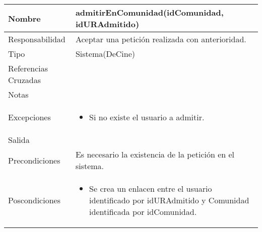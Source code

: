 \documentclass{article}
\begin{document}
\begin{table}[h]
\begin{tabular}{|l|l|l|l|l|l|}
\hline
\multicolumn{2}{|p{3cm}|}{Nombre} & \multicolumn{4}{p{10cm}|}{\textbf{admitirEnComunidad(idComunidad, idURAdmitido)}}\\
\hline
\multicolumn{2}{|p{3cm}|}{Responsabilidad} & \multicolumn{4}{p{10cm}|}{Aceptar una petición realizada con anterioridad.} \\
\hline
\multicolumn{2}{|p{3cm}|}{Tipo} & \multicolumn{4}{p{10cm}|}{Sistema(DeCine)} \\
\hline
\multicolumn{2}{|p{3cm}|}{Referencias Cruzadas} & \multicolumn{4}{p{10cm}|}{} \\
\hline
\multicolumn{2}{|p{3cm}|}{Notas} & \multicolumn{4}{p{10cm}|}{} \\
\hline
\multicolumn{2}{|p{3cm}|}{Excepciones} & \multicolumn{4}{p{10cm}|}{\begin{itemize}
\item Si no existe el usuario a admitir.
\end{itemize}} \\
\hline
\multicolumn{2}{|p{3cm}|}{Salida} & \multicolumn{4}{p{10cm}|}{} \\
\hline
\multicolumn{2}{|p{3cm}|}{Precondiciones} & \multicolumn{4}{p{10cm}|}{Es necesario la existencia de la petición en el sistema.} \\
\hline
\multicolumn{2}{|p{3cm}|}{Poscondiciones} & \multicolumn{4}{p{10cm}|}{\begin{itemize}
\item Se crea un enlacen entre el usuario identificado por idURAdmitido y Comunidad identificada por idComunidad.
\end{itemize}} \\
\hline
\end{tabular}
\end{table}
\end{document}
